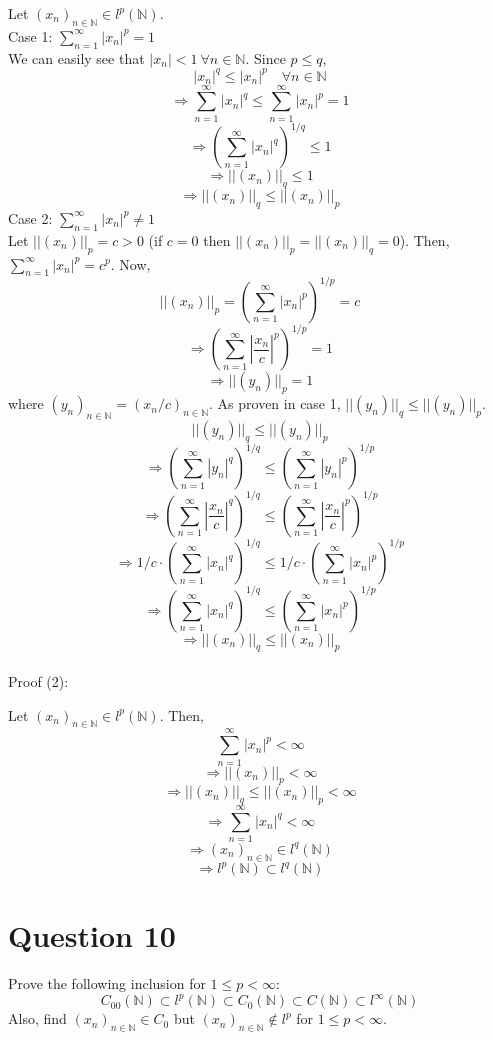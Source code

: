 \documentclass{article}
\begin{document}
	Let $(x_n)_{n \in \mathbb{N}} \in l^p(\mathbb{N})$. \\
	Case 1: $\sum_{n = 1}^{\infty} |x_n|^p = 1$ \\
	We can easily see that $|x_n| < 1 ~ \forall n \in \mathbb{N}$.
	Since $p \le q$,
	\[ |x_n|^q \le |x_n|^p \quad \forall n \in \mathbb{N} \]
	\[ \Rightarrow \sum_{n = 1}^{\infty} |x_n|^q \le \sum_{n = 1}^{\infty} |x_n|^p = 1 \]
	\[ \Rightarrow \left(\sum_{n = 1}^{\infty} |x_n|^q\right) ^ {1/q} \le 1 \]
	\[ \Rightarrow ||(x_n)||_q \le 1 \]
	\[ \Rightarrow ||(x_n)||_q \le ||(x_n)||_p \]
	Case 2: $\sum_{n = 1}^{\infty} |x_n|^p \ne 1$ \\
	Let $||(x_n)||_p = c > 0$ (if $c = 0$ then $||(x_n)||_p = ||(x_n)||_q = 0$).
	Then, $\sum_{n = 1}^{\infty} |x_n|^p = c^p$.
	Now,
	\[ ||(x_n)||_p = \left(\sum_{n = 1}^{\infty} |x_n|^p\right) ^ {1/p} = c \]
	\[ \Rightarrow \left(\sum_{n = 1}^{\infty} \left|\frac{x_n}{c}\right|^p\right) ^ {1/p} = 1 \]
	\[ \Rightarrow ||(y_n)||_p = 1 \]
	where $(y_n)_{n \in \mathbb{N}} = (x_n / c)_{n \in \mathbb{N}}$.
	As proven in case 1, $||(y_n)||_q \le ||(y_n)||_p$.
	\[ ||(y_n)||_q \le ||(y_n)||_p \]
	\[
		\Rightarrow \left(\sum_{n = 1}^{\infty} |y_n|^q\right) ^ {1/q} \le
		\left(\sum_{n = 1}^{\infty} |y_n|^p\right) ^ {1/p}
	\]
	\[
		\Rightarrow \left(\sum_{n = 1}^{\infty} \left|\frac{x_n}{c}\right|^q\right) ^ {1/q} \le
		\left(\sum_{n = 1}^{\infty} \left|\frac{x_n}{c}\right|^p\right) ^ {1/p}
	\]
	\[
		\Rightarrow 1/c \cdot \left(\sum_{n = 1}^{\infty} |x_n|^q\right) ^ {1/q} \le
		1/c \cdot \left(\sum_{n = 1}^{\infty} |x_n|^p\right) ^ {1/p}
	\]
	\[
		\Rightarrow \left(\sum_{n = 1}^{\infty} |x_n|^q\right) ^ {1/q} \le
		\left(\sum_{n = 1}^{\infty} |x_n|^p\right) ^ {1/p}
	\]
	\[ \Rightarrow ||(x_n)||_q \le ||(x_n)||_p \] \\

	Proof (2):

	Let $(x_n)_{n \in \mathbb{N}} \in l^p(\mathbb{N})$.
	Then,
	\[ \sum_{n = 1}^{\infty} |x_n|^p < \infty \]
	\[ \Rightarrow ||(x_n)||_p < \infty \]
	\[ \Rightarrow ||(x_n)||_q \le ||(x_n)||_p < \infty \]
	\[ \Rightarrow \sum_{n = 1}^{\infty} |x_n|^q < \infty \]
	\[ \Rightarrow (x_n)_{n \in \mathbb{N}} \in l^q(\mathbb{N}) \]
	\[ \Rightarrow l^p(\mathbb{N}) \subset l^q(\mathbb{N}) \]

\section{Question 10}

	Prove the following inclusion for $1 \le p < \infty$:
	\[
		C_{00}(\mathbb{N}) \subset l^p(\mathbb{N}) \subset C_0(\mathbb{N}) \subset
		C(\mathbb{N}) \subset l^{\infty}(\mathbb{N})
	\]
	Also, find $(x_n)_{n \in \mathbb{N}} \in C_0$ but $(x_n)_{n \in \mathbb{N}} \notin l^p$
	for $1 \le p < \infty$. \\
\end{document}
